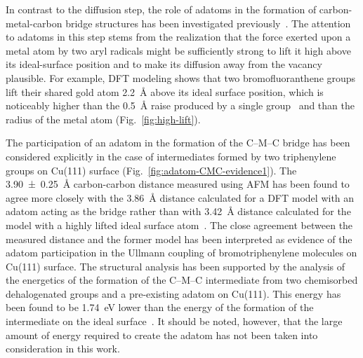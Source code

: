 \documentclass[%
 reprint,
 amsmath,amssymb,
 aps,
prb,
floatfix,
]{revtex4-2}
\newcommand{\lock}{\color{red}}
\newcommand{\lock}{\color{red}}
\newcommand{\comm}{\color{Purple}} %
\begin{document}
{\lock

In contrast to the diffusion step, the role of adatoms in the formation of carbon-metal-carbon bridge structures has been investigated previously~\cite{acsnano2017, acsnano2019}. %
The attention to adatoms in this step stems from the realization that the force exerted upon a metal atom by two aryl radicals might be sufficiently strong to lift it high above its ideal-surface position and to make its diffusion away from the vacancy plausible. 
For example, DFT modeling shows that two bromofluoranthene groups lift their shared gold atom \SI{2.2}{\angstrom} above its ideal surface position, which is noticeably higher than the \SI{0.5}{\angstrom} raise produced by a single group~\cite{jpcc2018} and than the radius of the metal atom (Fig.~\ref{fig:high-lift}). %

The participation of an adatom in the formation of the C--M--C bridge has been considered explicitly in the case of intermediates formed by two triphenylene groups on Cu(111) surface (Fig.~\ref{fig:adatom-CMC-evidence1}). 
The \SI{3.90\pm 0.25}{\angstrom} carbon-carbon distance measured using AFM has been found to agree more closely with the \SI{3.86}{\angstrom} distance calculated for a DFT model with an adatom acting as the bridge rather than with \SI{3.42}{\angstrom} distance calculated for the model with a highly lifted ideal surface atom~\cite{acsnano2017}. 
The close agreement between the measured distance and the former model has been interpreted as evidence of the adatom participation in the Ullmann coupling of bromotriphenylene molecules on Cu(111) surface. 
%
The structural analysis has been supported by the analysis of the energetics of the formation of the C--M--C intermediate from two chemisorbed dehalogenated groups and a pre-existing adatom on Cu(111). This energy has been found to be \SI{1.74}{\electronvolt} lower than the energy of the formation of the intermediate on the ideal surface~\cite{acsnano2017}. It should be noted, however, that the large amount of energy required to create the adatom has not been taken into consideration in this work.

}
\end{document}
